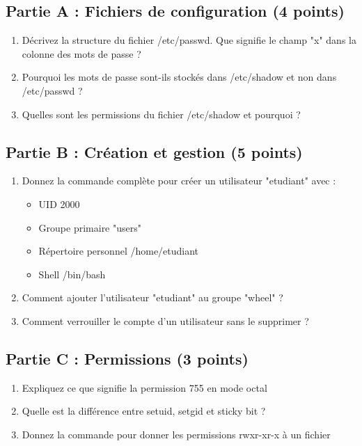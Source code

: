 \documentclass[12pt,a4paper]{article}
\begin{document}
\begin{questionbox}
\subsection*{Partie A : Fichiers de configuration (4 points)}
\begin{enumerate}[label=\alph*)]
    \item Décrivez la structure du fichier /etc/passwd. Que signifie le champ "x" dans la colonne des mots de passe ?
    \item Pourquoi les mots de passe sont-ils stockés dans /etc/shadow et non dans /etc/passwd ?
    \item Quelles sont les permissions du fichier /etc/shadow et pourquoi ?
\end{enumerate}

\subsection*{Partie B : Création et gestion (5 points)}
\begin{enumerate}[label=\alph*)]
    \item Donnez la commande complète pour créer un utilisateur "etudiant" avec :
    \begin{itemize}
        \item UID 2000
        \item Groupe primaire "users"
        \item Répertoire personnel /home/etudiant
        \item Shell /bin/bash
    \end{itemize}
    \item Comment ajouter l'utilisateur "etudiant" au groupe "wheel" ?
    \item Comment verrouiller le compte d'un utilisateur sans le supprimer ?
\end{enumerate}

\subsection*{Partie C : Permissions (3 points)}
\begin{enumerate}[label=\alph*)]
    \item Expliquez ce que signifie la permission 755 en mode octal
    \item Quelle est la différence entre setuid, setgid et sticky bit ?
    \item Donnez la commande pour donner les permissions rwxr-xr-x à un fichier
\end{enumerate}
\end{questionbox}
\end{document}

